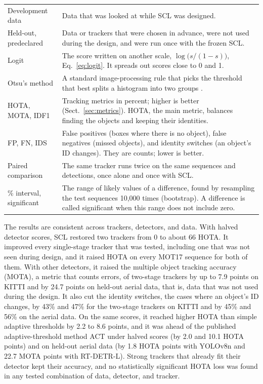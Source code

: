 \documentclass[pdflatex,sn-mathphys-num,iicol]{sn-jnl}
\newcommand{\scl}{SCL}
\begin{document}
\begin{table}[t]
\begin{tabular}{@{}>{\raggedright\arraybackslash}p{32mm}>{\raggedright\arraybackslash}p{123mm}@{}}
Development data & Data that was looked at while \scl{} was designed.\\
Held-out, predeclared & Data or trackers that were chosen in advance, were not used during the design, and were run once with the frozen \scl{}.\\
Logit & The score written on another scale, $\log\bigl(s/(1-s)\bigr)$, Eq.~\eqref{eq:logit}. It spreads out scores close to 0 and 1.\\
Otsu's method & A standard image-processing rule that picks the threshold that best splits a histogram into two groups \cite{otsu1979}.\\
HOTA, MOTA, IDF1 & Tracking metrics in percent; higher is better (Sect.~\ref{sec:metrics}). HOTA, the main metric, balances finding the objects and keeping their identities.\\
FP, FN, IDS & False positives (boxes where there is no object), false negatives (missed objects), and identity switches (an object's ID changes). They are counts; lower is better.\\
Paired comparison & The same tracker runs twice on the same sequences and detections, once alone and once with \scl{}.\\
95\% interval, significant & The range of likely values of a difference, found by resampling the test sequences 10,000 times (bootstrap). A difference is called significant when this range does not include zero.\\
\bottomrule
\end{tabular}
\end{table}

The results are consistent across trackers, detectors, and data. With halved detector scores,
\scl{} restored two trackers from 0 to about 66 HOTA. It improved every single-stage tracker that
was tested, including one that was not seen during design, and it raised HOTA on every MOT17
sequence for both of them. With other detectors, it raised the multiple object tracking accuracy
(MOTA), a metric that counts errors, of two-stage trackers by up to 7.9 points on KITTI and by 24.7
points on held-out aerial data, that is, data that was not used during the design. It also cut the
identity switches, the cases where an object's ID changes, by 43\% and 47\% for the two-stage
trackers on KITTI and by 45\% and 56\% on the aerial data. On the same scores, it reached higher
HOTA than simple adaptive thresholds by 2.2 to 8.6 points, and it was ahead of the published
adaptive-threshold method ACT under halved scores (by 2.0 and 10.1 HOTA points) and on held-out
aerial data (by 1.8 HOTA points with YOLOv8n and 22.7 MOTA points with RT-DETR-L). Strong trackers
that already fit their detector kept their accuracy, and no statistically significant HOTA loss was
found in any tested combination of data, detector, and tracker.
\end{document}
